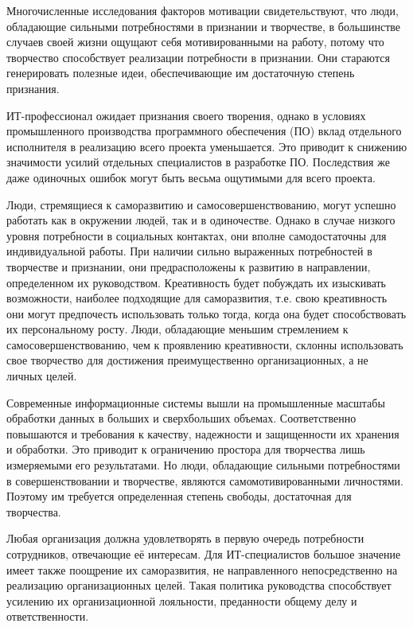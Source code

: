 \documentclass{../industrial-development}
\begin{document}
	\lecturenotes
	
	Многочисленные исследования факторов мотивации свидетельствуют, что люди, обладающие сильными потребностями в признании и творчестве, в большинстве случаев своей жизни ощущают себя мотивированными на работу, потому что творчество способствует реализации потребности в признании. Они стараются генерировать полезные идеи, обеспечивающие им достаточную степень признания.
	
	ИТ-профессионал ожидает признания своего творения, однако в условиях промышленного производства программного обеспечения (ПО) вклад отдельного исполнителя в реализацию всего проекта уменьшается. Это приводит к снижению значимости усилий отдельных специалистов в разработке ПО. Последствия же даже одиночных ошибок могут быть весьма ощутимыми для всего проекта.
	
	Люди, стремящиеся к саморазвитию и самосовершенствованию, могут успешно работать как в окружении людей, так и в одиночестве. Однако в случае низкого уровня потребности в социальных контактах, они вполне самодостаточны для индивидуальной работы. При наличии сильно выраженных потребностей в творчестве и признании, они предрасположены к развитию в направлении, определенном их руководством. Креативность будет побуждать их изыскивать возможности, наиболее подходящие для саморазвития, т.е. свою креативность они могут предпочесть использовать только тогда, когда она будет способствовать их персональному росту. Люди, обладающие меньшим стремлением к самосовершенствованию, чем к проявлению креативности, склонны использовать свое творчество для достижения преимущественно организационных, а не личных целей.
	
	Современные информационные системы вышли на промышленные масштабы обработки данных в больших и сверхбольших объемах. Соответственно повышаются и требования к качеству, надежности и защищенности их хранения и обработки. Это приводит к ограничению простора для творчества лишь измеряемыми его результатами. Но люди, обладающие сильными потребностями в совершенствовании и творчестве, являются самомотивированными личностями. Поэтому им требуется определенная степень свободы, достаточная для творчества.
	
	Любая организация должна удовлетворять в первую очередь потребности сотрудников, отвечающие её интересам. Для ИТ-специалистов большое значение имеет также поощрение их саморазвития, не направленного непосредственно на реализацию организационных целей. Такая политика руководства способствует усилению их организационной лояльности, преданности общему делу и ответственности.
	
\end{document}

